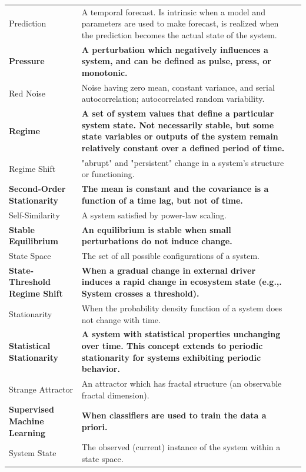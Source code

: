 \documentclass[print]{nuthesis}
\begin{document}
\begin{landscape}
\begin{longtable}{>{\raggedright\arraybackslash}p{12em}>{\raggedright\arraybackslash}p{35em}>{\raggedright\arraybackslash}p{8em}}
Prediction & A temporal forecast. Is intrinsic when a model and parameters are used to make forecast, is realized when the prediction becomes the actual state of the system. & \\
\textbf{Pressure} & \textbf{A perturbation which negatively influences a system, and can be defined as pulse, press, or monotonic.} & \textbf{}\\
Red Noise & Noise having zero mean, constant variance, and serial autocorrelation; autocorrelated random variability. & \\
\addlinespace
\textbf{Regime} & \textbf{A set of system values that define a particular system state. Not necessarily stable, but some state variables or outputs of the system remain relatively constant over a defined period of time.} & \textbf{}\\
Regime Shift & "abrupt" and "persistent" change in a system's structure or functioning. & \\
\textbf{Second-Order Stationarity} & \textbf{The mean is constant and the covariance is a function of a time lag, but not of time.} & \textbf{}\\
Self-Similarity & A system satisfied by  power-law scaling. & \\
\textbf{Stable Equilibrium} & \textbf{An equilibrium is stable when small perturbations do not induce change.} & \textbf{}\\
\addlinespace
State Space & The set of all possible configurations of a system. & \\
\textbf{State-Threshold Regime Shift} & \textbf{When a gradual change in external driver induces a rapid change in ecosystem state (e.g.,. System crosses a threshold).} & \textbf{}\\
Stationarity & When the probability density function of a system does not change with time. & \\
\textbf{Statistical Stationarity} & \textbf{A system with statistical properties unchanging over time. This concept extends to periodic stationarity for systems exhibiting periodic behavior.} & \textbf{}\\
Strange Attractor & An attractor which has fractal structure (an observable fractal dimension). & \\
\addlinespace
\textbf{Supervised Machine Learning} & \textbf{When classifiers are used to train the data a priori.} & \textbf{}\\
System State & The observed (current) instance of the system within a state space. & \\

\end{longtable}
\end{landscape}
\end{document}
